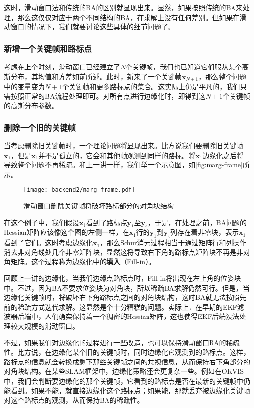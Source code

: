 这时，滑动窗口法和传统的BA的区别就显现出来。显然，如果按照传统的BA来处理，那么这仅仅对应于两个不同结构的BA，在求解上没有任何差别。但如果在滑动窗口的情况下，我们就要讨论这些具体的细节问题了。

\subsubsection{新增一个关键帧和路标点}
考虑在上个时刻，滑动窗口已经建立了$N$个关键帧，我们也已知道它们服从某个高斯分布，其均值和方差如前所述。此时，新来了一个关键帧$\bm{x}_{N+1}$，那么整个问题中的变量变为$N+1$个关键帧和更多路标点的集合。这实际上仍是平凡的，我们只需按照正常的BA流程处理即可。对所有点进行边缘化时，即得到这$N+1$个关键帧的高斯分布参数。

\subsubsection{删除一个旧的关键帧}
当考虑删除旧关键帧时，一个理论问题将显现出来。比方说我们要删除旧关键帧$\bm{x}_1$，但是$\bm{x}_1$并不是孤立的，它会和其他帧观测到同样的路标。将$\bm{x}_1$边缘化之后将导致整个问题不再稀疏。和上一讲一样，我们举一个示意图，如\autoref{fig:marg-frame}所示。

\begin{figure}[!ht]
    \centering
    \texttt{[image: backend2/marg-frame.pdf]}
    \caption{滑动窗口删除关键帧将破坏路标部分的对角块结构}
    \label{fig:marg-frame}
\end{figure}

在这个例子中，我们假设$\bm{x}_1$看到了路标点$\bm{y}_1$至$\bm{y}_4$，于是，在处理之前，BA问题的Hessian矩阵应该像这个图的左侧一样，在$\bm{x}_1$行的$\bm{y}_1$到$\bm{y}_4$列存在着非零块，表示$\bm{x}_1$看到了它们。这时考虑边缘化$\bm{x}_1$，那么Schur消元过程相当于通过矩阵行和列操作消去非对角线处几个非零矩阵块，显然这将导致右下角的路标点矩阵块不再是非对角矩阵。这个过程称为边缘化中的\textbf{填入}（Fill-in）\textsuperscript{\cite{Sibley2008}}。

回顾上一讲的边缘化，当我们边缘点路标点时，Fill-in将出现在左上角的位姿块中。不过，因为BA不要求位姿块为对角块，所以稀疏BA求解仍然可行。但是，当边缘化关键帧时，将破坏右下角路标点之间的对角块结构，这时BA就无法按照先前的稀疏方式迭代求解。这显然是个十分糟糕的问题。实际上，在早期的EKF滤波器后端中，人们确实保持着一个稠密的Hessian矩阵，这也使得EKF后端没法处理较大规模的滑动窗口。

不过，如果我们对边缘化的过程进行一些改造，也可以保持滑动窗口BA的稀疏性。比方说，在边缘化某个旧的关键帧时，同时边缘化它观测到的路标点。这样，路标点的信息就会转换成剩下那些关键帧之间的共视信息，从而保持右下角部分的对角块结构。在某些SLAM框架\textsuperscript{\cite{Leutenegger2015,Engel2016}}中，边缘化策略还会更复杂一些。例如在OKVIS中，我们会判断要边缘化的那个关键帧，它看到的路标点是否在最新的关键帧中仍能看到。如果不能，就直接边缘化这个路标点；如果能，那就丢弃被边缘化关键帧对这个路标点的观测，从而保持BA的稀疏性。

